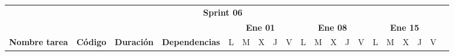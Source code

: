 \begin{longtable}[c]{llclllllllllllllllll}
        \multicolumn{19}{|c|}{\cellcolor[HTML]{8EA9D8}\textbf{Sprint 06}}                                                                                                                                                                                                                                                                                                                                                                                                                                                                                                                                                                                                                                                                                                                                                                                                                                                              &  \\ \cline{1-19}
        \multicolumn{1}{|c|}{}                                                                                                  & \multicolumn{1}{c|}{}                                                          & \multicolumn{1}{c|}{}                                                            & \multicolumn{1}{c|}{}                                                                & \multicolumn{5}{c|}{\textbf{Ene 01}}                                                                                                                                    & \multicolumn{5}{c|}{\textbf{Ene 08}}                                                                                                                                    & \multicolumn{5}{c|}{\textbf{Ene 15}}                                                                                                                                                  &  \\ \cline{5-19}
        \multicolumn{1}{|c|}{\multirow{-2}{*}{\textbf{Nombre tarea}}}                                                           & \multicolumn{1}{c|}{\multirow{-2}{*}{\textbf{Código}}}                         & \multicolumn{1}{c|}{\multirow{-2}{*}{\textbf{Duración}}}                         & \multicolumn{1}{c|}{\multirow{-2}{*}{\textbf{Dependencias}}}                         & \multicolumn{1}{l|}{L}          & \multicolumn{1}{l|}{M}          & \multicolumn{1}{l|}{X}          & \multicolumn{1}{l|}{J}          & \multicolumn{1}{l|}{V}          & \multicolumn{1}{l|}{L}          & \multicolumn{1}{l|}{M}          & \multicolumn{1}{l|}{X}          & \multicolumn{1}{l|}{J}          & \multicolumn{1}{l|}{V}          & \multicolumn{1}{l|}{L}          & \multicolumn{1}{l|}{M}          & \multicolumn{1}{l|}{X}          & \multicolumn{1}{l|}{J}          & \multicolumn{1}{l|}{V}                        &  \\ \cline{1-19}

\end{longtable}

